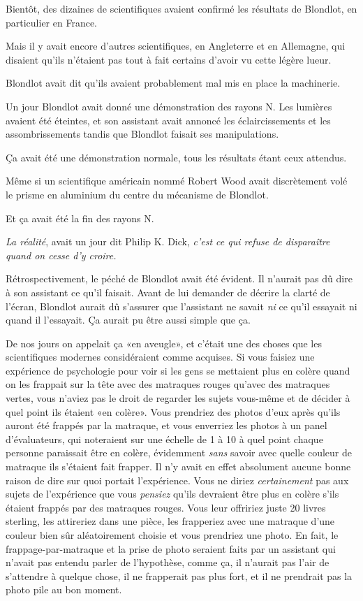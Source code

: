 Bientôt, des dizaines de scientifiques avaient confirmé les résultats de Blondlot, en particulier en France.

Mais il y avait encore d'autres scientifiques, en Angleterre et en Allemagne, qui disaient qu'ils n'étaient pas tout à fait certains d'avoir vu cette légère lueur.

Blondlot avait dit qu'ils avaient probablement mal mis en place la machinerie.

Un jour Blondlot avait donné une démonstration des rayons N. Les lumières avaient été éteintes, et son assistant avait annoncé les éclaircissements et les assombrissements tandis que Blondlot faisait ses manipulations.

Ça avait été une démonstration normale, tous les résultats étant ceux attendus.

Même si un scientifique américain nommé Robert Wood avait discrètement volé le prisme en aluminium du centre du mécanisme de Blondlot.

Et ça avait été la fin des rayons N.

\emph{La réalité}, avait un jour dit Philip K. Dick, \emph{c'est ce qui refuse de disparaître quand on cesse d'y croire.}

Rétrospectivement, le péché de Blondlot avait été évident. Il n'aurait pas dû dire à son assistant ce qu'il faisait. Avant de lui demander de décrire la clarté de l'écran, Blondlot aurait dû s'assurer que l'assistant ne savait \emph{ni} ce qu'il essayait ni quand il l'essayait. Ça aurait pu être aussi simple que ça.

De nos jours on appelait ça «en aveugle», et c'était une des choses que les scientifiques modernes considéraient comme acquises. Si vous faisiez une expérience de psychologie pour voir si les gens se mettaient plus en colère quand on les frappait sur la tête avec des matraques rouges qu'avec des matraques vertes, vous n'aviez pas le droit de regarder les sujets vous-même et de décider à quel point ils étaient «en colère». Vous prendriez des photos d'eux après qu'ils auront été frappés par la matraque, et vous enverriez les photos à un panel d'évaluateurs, qui noteraient sur une échelle de 1 à 10 à quel point chaque personne paraissait être en colère, évidemment \emph{sans} savoir avec quelle couleur de matraque ils s'étaient fait frapper. Il n'y avait en effet absolument aucune bonne raison de dire sur quoi portait l'expérience. Vous ne diriez \emph{certainement} pas aux sujets de l'expérience que vous \emph{pensiez} qu'ils devraient être plus en colère s'ils étaient frappés par des matraques rouges. Vous leur offririez juste 20 livres sterling, les attireriez dans une pièce, les frapperiez avec une matraque d'une couleur bien sûr aléatoirement choisie et vous prendriez une photo. En fait, le frappage-par-matraque et la prise de photo seraient faits par un assistant qui n'avait pas entendu parler de l'hypothèse, comme ça, il n'aurait pas l'air de s'attendre à quelque chose, il ne frapperait pas plus fort, et il ne prendrait pas la photo pile au bon moment.

